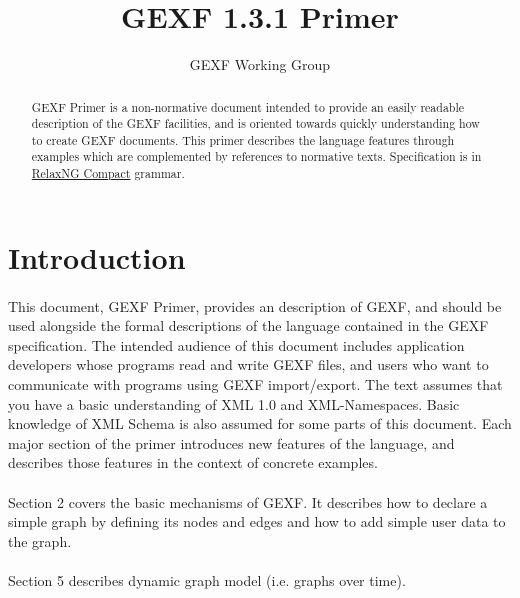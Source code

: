 \documentclass[a4paper,10pt]{article}
\title{GEXF 1.3.1 Primer}
\author{GEXF Working Group}
\begin{document}
\maketitle

\begin{abstract}
GEXF Primer is a non-normative document intended to provide an easily readable description of the GEXF facilities, and is oriented towards quickly understanding how to create GEXF documents. This primer describes the language features through examples which are complemented by references to normative texts. Specification is in \href{http://relaxng.org/compact-tutorial-20030326.html}{RelaxNG Compact} grammar.
\end{abstract}

\tableofcontents

\section{Introduction} \label{introduction}

\paragraph{}
This document, GEXF Primer, provides an description of GEXF, and should be used alongside the formal descriptions of the language contained in the GEXF specification. The intended audience of this document includes application developers whose programs read and write GEXF files, and users who want to communicate with programs using GEXF import/export. The text assumes that you have a basic understanding of XML 1.0 and  XML-Namespaces. Basic knowledge of XML Schema is also assumed for some parts of this document. Each major section of the primer introduces new features of the language, and describes those features in the context of concrete examples.

\paragraph{}
Section 2 covers the basic mechanisms of GEXF. It describes how to declare a simple graph by defining its nodes and edges and how to add simple user data to the graph.

\paragraph{}
Section 5 describes dynamic graph model (i.e. graphs over time).
\end{document}
